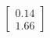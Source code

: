 \documentclass[preview]{standalone}
\begin{document}
\begin{align*}
\begin{bmatrix} 0.14 \\ 1.66 \end{bmatrix}
\end{align*}
\end{document}
